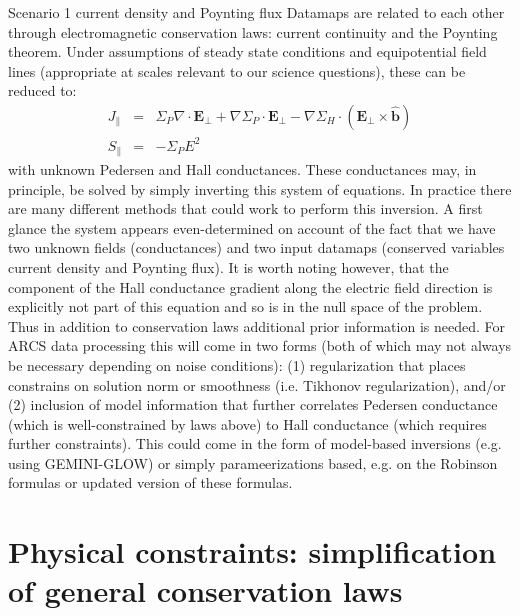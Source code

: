 \documentclass[11pt,letterpaper]{article}
\begin{document}
Scenario 1 current density and Poynting flux Datamaps are related to each other through electromagnetic conservation laws:  current continuity and the Poynting theorem.  Under assumptions of steady state conditions and equipotential field lines (appropriate at scales relevant to our science questions), these can be reduced to:
\begin{eqnarray}
J_\parallel &=& \Sigma_P \nabla \cdot \mathbf{E}_\perp + \nabla \Sigma_P \cdot \mathbf{E}_\perp - \nabla \Sigma_H \cdot \left( \mathbf{E}_\perp \times \hat{\mathbf{b}} \right) \\
S_{\parallel}  &=& - \Sigma_P E^2
\end{eqnarray}
with unknown Pedersen and Hall conductances.  These conductances may, in principle, be solved by simply inverting this system of equations.  In practice there are many different methods that could work to perform this inversion.  A first glance the system appears even-determined on account of the fact that we have two unknown fields (conductances) and two input datamaps (conserved variables current density and Poynting flux).  It is worth noting however, that the component of the Hall conductance gradient along the electric field direction is explicitly not part of this equation and so is in the null space of the problem.  Thus in addition to conservation laws additional prior information is needed.  For ARCS data processing this will come in two forms (both of which may not always be necessary depending on noise conditions):  (1) regularization that places constrains on solution norm or smoothness (i.e. Tikhonov regularization), and/or (2) inclusion of model information that further correlates Pedersen conductance (which is well-constrained by laws above) to Hall conductance (which requires further constraints).   This could come in the form of model-based inversions (e.g. using GEMINI-GLOW) or simply parameerizations based, e.g. on the Robinson formulas or updated version of these formulas.  



\section{Physical constraints:  simplification of general conservation laws}
\end{document}
